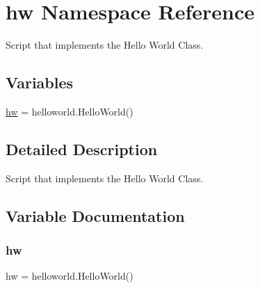 \hypertarget{namespacehw}{}\section{hw Namespace Reference}
\label{namespacehw}


Script that implements the Hello World Class.  


\subsection*{Variables}
\begin{DoxyCompactItemize}
\item 
\hyperlink{namespacehw_ab67f5bd69fb707530c4fb25c3b71ac2c}{hw} = helloworld.\+Hello\+World()
\end{DoxyCompactItemize}


\subsection{Detailed Description}
Script that implements the Hello World Class. 



\subsection{Variable Documentation}
\mbox{\label{namespacehw_ab67f5bd69fb707530c4fb25c3b71ac2c}} 
\subsubsection{\texorpdfstring{hw}{hw}}
{\footnotesize\ttfamily hw = helloworld.\+Hello\+World()}

